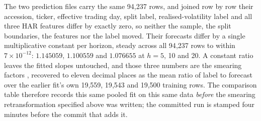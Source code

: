 The two prediction files carry the same 94{,}237 rows, and joined row by row
their accession, ticker, effective trading day, split label,
realised-volatility label and all three HAR features differ by exactly zero, so
neither the sample, the split boundaries, the features nor the label
moved. %
Their forecasts differ by a single multiplicative constant per horizon, steady
across all 94{,}237 rows to within $7\times10^{-12}$: $1.145059$, $1.100559$
and $1.076655$ at $h=5$, 10 and 20. %
A constant ratio leaves the fitted slopes untouched, and those three numbers
are the smearing factors \cite{duan1983smearing}, recovered to eleven decimal
places as the mean ratio of label to forecast over the earlier fit's own
19{,}559, 19{,}543 and 19{,}500 training rows. %
The comparison table therefore records this same pooled fit on this same data
\emph{before} the smearing retransformation
specified above was written; the committed run is
stamped four minutes before the commit that adds it. %

